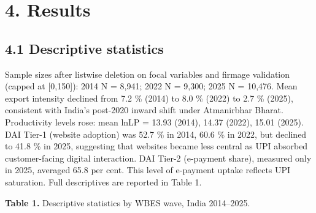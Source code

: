 \documentclass[
  12pt]{article}
\begin{document}
\hypertarget{results}{%
\section{4. Results}\label{results}}

\hypertarget{descriptive-statistics}{%
\subsection{4.1 Descriptive statistics}\label{descriptive-statistics}}

Sample sizes after listwise deletion on focal variables and firmage
validation (capped at {[}0,150{]}): 2014 N = 8,941; 2022 N = 9,300; 2025
N = 10,476. Mean export intensity declined from 7.2 \% (2014) to 8.0 \%
(2022) to 2.7 \% (2025), consistent with India's post-2020 inward shift
under Atmanirbhar Bharat. Productivity levels rose: mean lnLP = 13.93
(2014), 14.37 (2022), 15.01 (2025). DAI Tier-1 (website adoption) was
52.7 \% in 2014, 60.6 \% in 2022, but declined to 41.8 \% in 2025,
suggesting that websites became less central as UPI absorbed
customer-facing digital interaction. DAI Tier-2 (e-payment share),
measured only in 2025, averaged 65.8 per cent. This level of e-payment
uptake reflects UPI saturation. Full descriptives are reported in Table
1.

\textbf{Table 1.} Descriptive statistics by WBES wave, India 2014--2025.
\end{document}
